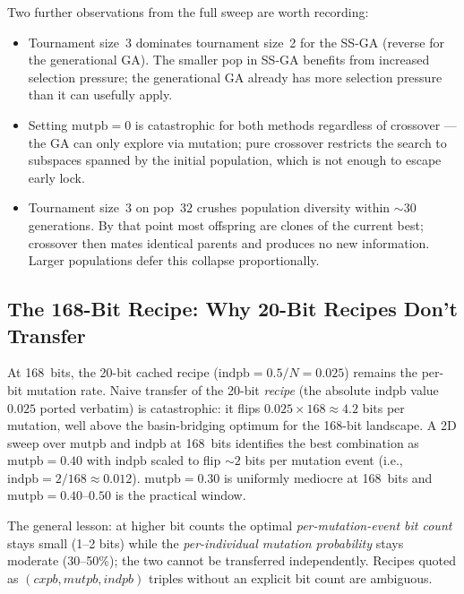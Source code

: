 Two further observations from the full sweep are worth recording:
\begin{itemize}
\item Tournament size~3 dominates tournament size~2 for the SS-GA
      (reverse for the generational GA). The smaller pop in SS-GA
      benefits from increased selection pressure; the generational
      GA already has more selection pressure than it can usefully
      apply.
\item Setting $\mathrm{mutpb} = 0$ is catastrophic for both methods
      regardless of crossover --- the GA can only explore via
      mutation; pure crossover restricts the search to subspaces
      spanned by the initial population, which is not enough to
      escape early lock.
\item Tournament size~3 on pop~$32$ crushes population diversity
      within $\sim\!30$ generations. By that point most offspring
      are clones of the current best; crossover then mates
      identical parents and produces no new information. Larger
      populations defer this collapse proportionally.
\end{itemize}

\subsection{The 168-Bit Recipe: Why 20-Bit Recipes Don't Transfer}

At 168~bits, the 20-bit cached recipe ($\mathrm{indpb} = 0.5/N = 0.025$)
remains the per-bit mutation rate. Naive transfer of the 20-bit
\emph{recipe} (the absolute $\mathrm{indpb}$ value $0.025$ ported
verbatim) is catastrophic: it flips $0.025 \times 168 \approx 4.2$
bits per mutation, well above the basin-bridging optimum for the
168-bit landscape. A 2D sweep over $\mathrm{mutpb}$ and
$\mathrm{indpb}$ at 168~bits identifies the best combination as
$\mathrm{mutpb} = 0.40$ with $\mathrm{indpb}$ scaled to flip
$\sim\!2$ bits per mutation event (i.e., $\mathrm{indpb} = 2/168
\approx 0.012$). $\mathrm{mutpb} = 0.30$ is uniformly mediocre at
168~bits and $\mathrm{mutpb} = 0.40$--$0.50$ is the practical
window.

The general lesson: at higher bit counts the optimal
\emph{per-mutation-event bit count} stays small (1--2 bits) while
the \emph{per-individual mutation probability} stays moderate
(30--50\%); the two cannot be transferred independently. Recipes
quoted as $(cxpb, mutpb, indpb)$ triples without an explicit bit
count are ambiguous.

